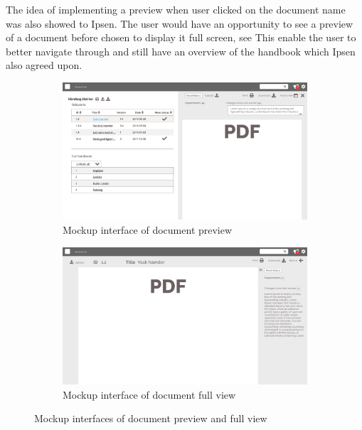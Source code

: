 The idea of implementing a preview when user clicked on the document name was also showed to Ipsen.
The user would have an opportunity to see a preview of a document before chosen to display it full screen, see 
This enable the user to better navigate through and still have an overview of the handbook which Ipsen also agreed upon.

\begin{figure}[H]
	\centering
	\begin{subfigure}[b]{0.48\textwidth}
		\includegraphics[width=\textwidth]{billeder/PreviewVersion.jpg}
		\caption{Mockup interface of document preview}
	\end{subfigure}
	\quad
	\begin{subfigure}[b]{0.48\textwidth}
		\includegraphics[width=\textwidth]{billeder/FullView.jpg}
		\caption{Mockup interface of document full view}
	\end{subfigure}
	\caption{Mockup interfaces of document preview and full view}\label{fig:mockupPreview}
\end{figure}

